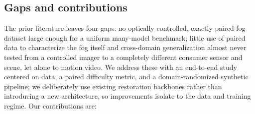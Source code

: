 \documentclass{optica-article}
\begin{document}
\subsection{Gaps and contributions}
\label{sec:contributions}

The prior literature leaves four gaps: no optically controlled,
exactly paired fog dataset large enough for a uniform many-model
benchmark; little use of paired data to characterize the fog
itself and cross-domain generalization almost never tested from a
controlled imager to a completely different consumer sensor and
scene, let alone to motion video. We address these with an
end-to-end study centered on data, a paired difficulty metric, and
a domain-randomized synthetic pipeline; we deliberately use existing
restoration backbones rather than introducing a new architecture,
so improvements isolate to the data and training regime. Our
contributions are:
\end{document}
